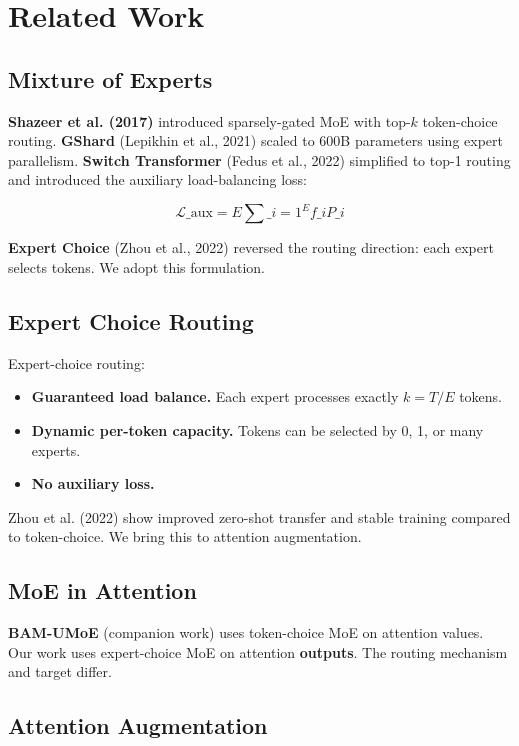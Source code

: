 \section{Related Work}

\subsection{Mixture of Experts}

\textbf{Shazeer et al. (2017)} introduced sparsely-gated MoE with top-$k$ 
token-choice routing. \textbf{GShard} (Lepikhin et al., 2021) scaled to 600B 
parameters using expert parallelism. \textbf{Switch Transformer} (Fedus et al., 
2022) simplified to top-1 routing and introduced the auxiliary 
load-balancing loss:

\[
\mathcal{L}\_\text{aux} = E \sum\_{i=1}^{E} f\_i P\_i
\tag{2.1}
\]

\textbf{Expert Choice} (Zhou et al., 2022) reversed the routing direction:
each expert selects tokens. We adopt this formulation.

\subsection{Expert Choice Routing}

Expert-choice routing:

\begin{itemize}
\item \textbf{Guaranteed load balance.} Each expert processes exactly $k = T / E$
  tokens.
\item \textbf{Dynamic per-token capacity.} Tokens can be selected by 0, 1, or many
  experts.
\item \textbf{No auxiliary loss.}

\end{itemize}
Zhou et al. (2022) show improved zero-shot transfer and stable training 
compared to token-choice. We bring this to attention augmentation.

\subsection{MoE in Attention}

\textbf{BAM-UMoE} (companion work) uses token-choice MoE on attention values. 
Our work uses expert-choice MoE on attention \textbf{outputs}. The routing 
mechanism and target differ.

\subsection{Attention Augmentation}


